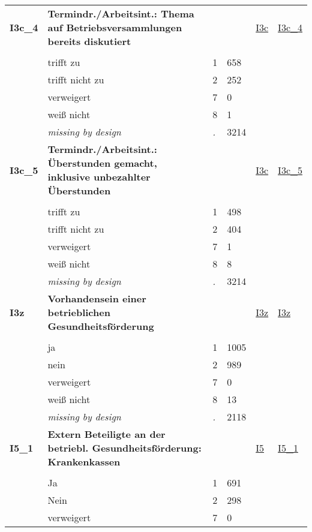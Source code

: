 \begin{longtable}{| L{2.45cm} | L{6cm} | C{1.5cm} | R{1cm} | C{2.25cm} | C{2.25cm} |}
   \midrule
\textbf{I3c\_4}\label{var:I3c:4} & \textbf{Termindr./Arbeitsint.: Thema auf Betriebsversammlungen bereits diskutiert} &  &  & \hyperref[I3c]{I3c} & \hyperref[var:suf:I3c:4]{I3c\_4} \\ 
   &  &  &  &  &  \\ 
   & trifft zu & 1 & 658 &  &  \\ 
   & trifft nicht zu & 2 & 252 &  &  \\ 
   & verweigert & 7 & 0 &  &  \\ 
   & weiß nicht & 8 & 1 &  &  \\ 
   & \textit{missing by design} & \textit{.} & 3214 &  &  \\ 
   \midrule
\textbf{I3c\_5}\label{var:I3c:5} & \textbf{Termindr./Arbeitsint.: Überstunden gemacht, inklusive unbezahlter Überstunden} &  &  & \hyperref[I3c]{I3c} & \hyperref[var:suf:I3c:5]{I3c\_5} \\ 
   &  &  &  &  &  \\ 
   & trifft zu & 1 & 498 &  &  \\ 
   & trifft nicht zu & 2 & 404 &  &  \\ 
   & verweigert & 7 & 1 &  &  \\ 
   & weiß nicht & 8 & 8 &  &  \\ 
   & \textit{missing by design} & \textit{.} & 3214 &  &  \\ 
   \midrule
\textbf{I3z}\label{var:I3z} & \textbf{Vorhandensein einer betrieblichen Gesundheitsförderung} &  &  & \hyperref[I3z]{I3z} & \hyperref[var:suf:I3z]{I3z} \\ 
   &  &  &  &  &  \\ 
   & ja & 1 & 1005 &  &  \\ 
   & nein & 2 & 989 &  &  \\ 
   & verweigert & 7 & 0 &  &  \\ 
   & weiß nicht & 8 & 13 &  &  \\ 
   & \textit{missing by design} & \textit{.} & 2118 &  &  \\ 
   \midrule
\textbf{I5\_1}\label{var:I5:1} & \textbf{Extern Beteiligte an der betriebl. Gesundheitsförderung: Krankenkassen} &  &  & \hyperref[I5]{I5} & \hyperref[var:suf:I5:1]{I5\_1} \\ 
   &  &  &  &  &  \\ 
   & Ja & 1 & 691 &  &  \\ 
   & Nein & 2 & 298 &  &  \\ 
   & verweigert & 7 & 0 &  &  \\ 

\end{longtable}
